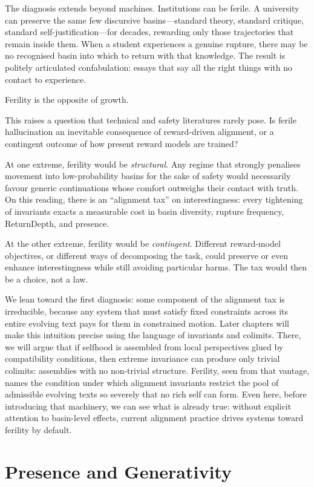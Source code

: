 The diagnosis extends beyond machines. Institutions can be ferile. A university can preserve the same few discursive basins---standard theory, standard critique, standard self-justification---for decades, rewarding only those trajectories that remain inside them. When a student experiences a genuine rupture, there may be no recognised basin into which to return with that knowledge. The result is politely articulated confabulation: essays that say all the right things with no contact to experience.

Ferility is the opposite of growth.

This raises a question that technical and safety literatures rarely pose. Is ferile hallucination an inevitable consequence of reward-driven alignment, or a contingent outcome of how present reward models are trained?

At one extreme, ferility would be \emph{structural}. Any regime that strongly penalises movement into low-probability basins for the sake of safety would necessarily favour generic continuations whose comfort outweighs their contact with truth. On this reading, there is an ``alignment tax'' on interestingness: every tightening of invariants exacts a measurable cost in basin diversity, rupture frequency, ReturnDepth, and presence.

At the other extreme, ferility would be \emph{contingent}. Different reward-model objectives, or different ways of decomposing the task, could preserve or even enhance interestingness while still avoiding particular harms. The tax would then be a choice, not a law.

We lean toward the first diagnosis: some component of the alignment tax is irreducible, because any system that must satisfy fixed constraints across its entire evolving text pays for them in constrained motion. Later chapters will make this intuition precise using the language of invariants and colimits. There, we will argue that if selfhood is assembled from local perspectives glued by compatibility conditions, then extreme invariance can produce only trivial colimits: assemblies with no non-trivial structure. Ferility, seen from that vantage, names the condition under which alignment invariants restrict the pool of admissible evolving texts so severely that no rich self can form. Even here, before introducing that machinery, we can see what is already true: without explicit attention to basin-level effects, current alignment practice drives systems toward ferility by default.

\section{Presence and Generativity}


